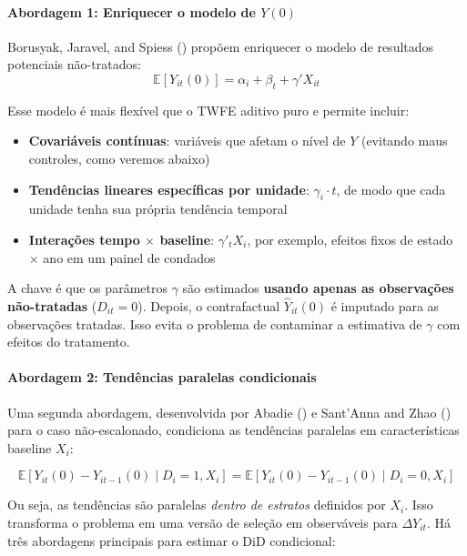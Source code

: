 \documentclass[
]{article}
\providecommand{\tightlist}{%
  \setlength{\itemsep}{0pt}\setlength{\parskip}{0pt}}
\begin{document}
\paragraph{\texorpdfstring{Abordagem 1: Enriquecer o modelo de \(Y(0)\)}{Abordagem 1: Enriquecer o modelo de Y(0)}}\label{abordagem-1-enriquecer-o-modelo-de-y0}

Borusyak, Jaravel, and Spiess () propõem enriquecer o modelo de resultados potenciais não-tratados:
\[
\mathbb{E}[Y_{it}(0)] = \alpha_i + \beta_t + \gamma' X_{it}
\]

Esse modelo é mais flexível que o TWFE aditivo puro e permite incluir:

\begin{itemize}
\tightlist
\item
  \textbf{Covariáveis contínuas}: variáveis que afetam o nível de \(Y\) (evitando maus controles, como veremos abaixo)
\item
  \textbf{Tendências lineares específicas por unidade}: \(\gamma_i \cdot t\), de modo que cada unidade tenha sua própria tendência temporal
\item
  \textbf{Interações tempo \(\times\) baseline}: \(\gamma'_t X_i\), por exemplo, efeitos fixos de estado \(\times\) ano em um painel de condados
\end{itemize}

A chave é que os parâmetros \(\gamma\) são estimados \textbf{usando apenas as observações não-tratadas} (\(D_{it} = 0\)). Depois, o contrafactual \(\hat{Y}_{it}(0)\) é imputado para as observações tratadas. Isso evita o problema de contaminar a estimativa de \(\gamma\) com efeitos do tratamento.

\paragraph{Abordagem 2: Tendências paralelas condicionais}\label{abordagem-2-tenduxeancias-paralelas-condicionais}

Uma segunda abordagem, desenvolvida por Abadie () e Sant'Anna and Zhao () para o caso não-escalonado, condiciona as tendências paralelas em características baseline \(X_i\):

\[
\mathbb{E}[Y_{it}(0) - Y_{it-1}(0) \mid D_i = 1, X_i] = \mathbb{E}[Y_{it}(0) - Y_{it-1}(0) \mid D_i = 0, X_i]
\]

Ou seja, as tendências são paralelas \emph{dentro de estratos} definidos por \(X_i\). Isso transforma o problema em uma versão de seleção em observáveis para \(\Delta Y_{it}\). Há três abordagens principais para estimar o DiD condicional:
\end{document}
